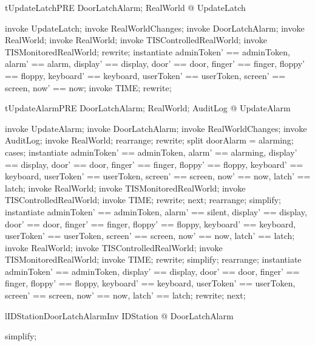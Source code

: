 \begin{theorem}{tUpdateLatchPRE}
\forall  DoorLatchAlarm; RealWorld @ \pre  UpdateLatch
\end{theorem}

\begin{zproof}[tUpdateLatchPRE]
invoke UpdateLatch;
invoke RealWorldChanges;
invoke \Xi DoorLatchAlarm;
invoke \Delta RealWorld;
invoke RealWorld;
invoke TISControlledRealWorld;
invoke TISMonitoredRealWorld;
rewrite;
instantiate adminToken' == adminToken, alarm' == alarm, display' == display, door' == door, finger' == finger, floppy' == floppy, keyboard' == keyboard, userToken' == userToken, screen' == screen, now' == now;
invoke TIME;
rewrite;
\end{zproof}

\begin{theorem}{tUpdateAlarmPRE}
\forall  DoorLatchAlarm; RealWorld; AuditLog @ \pre  UpdateAlarm
\end{theorem}

\begin{zproof}[tUpdateAlarmPRE]
invoke UpdateAlarm;
invoke \Xi DoorLatchAlarm;
invoke RealWorldChanges;
invoke AuditLog;
invoke \Delta RealWorld;
rearrange;
rewrite;
split doorAlarm = alarming;
cases;
instantiate adminToken' == adminToken, alarm' == alarming, display' == display, door' == door, finger' == finger, floppy' == floppy, keyboard' == keyboard, userToken' == userToken, screen' == screen, now' == now, latch' == latch;
invoke RealWorld;
invoke TISMonitoredRealWorld;
invoke TISControlledRealWorld;
invoke TIME;
rewrite;
next;
rearrange;
simplify;
instantiate adminToken' == adminToken, alarm' == silent, display' == display, door' == door, finger' == finger, floppy' == floppy, keyboard' == keyboard, userToken' == userToken, screen' == screen, now' == now, latch' == latch;
invoke RealWorld;
invoke TISControlledRealWorld;
invoke TISMonitoredRealWorld;
invoke TIME;
rewrite;
simplify;
rearrange;
instantiate adminToken' == adminToken, display' == display, door' == door, finger' == finger, floppy' == floppy, keyboard' == keyboard, userToken' == userToken, screen' == screen, now' == now, latch' == latch;
rewrite;
next;
\end{zproof}

\begin{theorem}{lIDStationDoorLatchAlarmInv}
\forall  IDStation @ DoorLatchAlarm
\end{theorem}

\begin{zproof}[lIDStationDoorLatchAlarmInv]
simplify;
\end{zproof}

